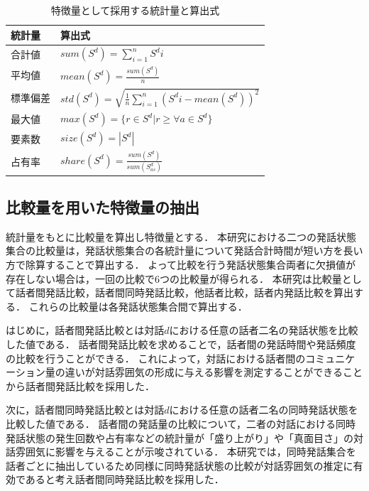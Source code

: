 \begingroup
\renewcommand{\arraystretch}{1.5}
\begin{table}[t]
    \caption{特徴量として採用する統計量と算出式}
    \centering
    \begin{tabular}{ll}
        \hline
        統計量 & 算出式 \\
        \hline\hline
        合計値 & $sum(S^d) = \sum_{i=1}^n S^di$ \\
        \hline
        平均値 & $mean(S^d) = \frac{sum(S^d)}{n}$ \\
        \hline
        標準偏差 & $std(S^d) = \sqrt{\frac{1}{n}\sum_{i=1}^n (S^di - mean(S^d))^2}$ \\
        \hline
        最大値 & $max(S^d) = \{r\in{S^d} | r \geq \forall{a}\in{S^d} \}$ \\
        \hline
        要素数  & $size(S^d) = |S^d|$ \\
        \hline
        占有率  & $share(S^d) = \frac{sum(S^d)}{sum(S^d_{as})}$ \\
        \hline
    \end{tabular}
    \label{tab:statistics_and_formulas}
\end{table}
\endgroup

\subsection{比較量を用いた特徴量の抽出}

統計量をもとに比較量を算出し特徴量とする．
本研究における二つの発話状態集合の比較量は，発話状態集合の各統計量について発話合計時間が短い方を長い方で除算することで算出する．
よって比較を行う発話状態集合両者に欠損値が存在しない場合は，一回の比較で6つの比較量が得られる．
本研究は比較量として話者間発話比較，話者間同時発話比較，他話者比較，話者内発話比較を算出する．
これらの比較量は各発話状態集合間で算出する．

はじめに，話者間発話比較とは対話$d$における任意の話者二名の発話状態を比較した値である．
話者間発話比較を求めることで，話者間の発話時間や発話頻度の比較を行うことができる．
これによって，対話における話者間のコミュニケーション量の違いが対話雰囲気の形成に与える影響を測定することができることから話者間発話比較を採用した．

次に，話者間同時発話比較とは対話$d$における任意の話者二名の同時発話状態を比較した値である．
話者間の発話量の比較について，二者の対話における同時発話状態の発生回数や占有率などの統計量が「盛り上がり」や「真面目さ」の対話雰囲気に影響を与えることが示唆されている\cite{Ito}\cite{Toyota}．
本研究では，同時発話集合を話者ごとに抽出しているため同様に同時発話状態の比較が対話雰囲気の推定に有効であると考え話者間同時発話比較を採用した．

